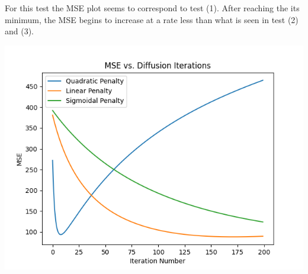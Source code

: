 \documentclass{article}
\begin{document}
  \noindent For this test the MSE plot seems to correspond to
  test (1). After reaching the its minimum, the MSE begins to
  increase at a rate less than what is seen in test (2) and (3).
  \begin{center}
    \includegraphics[scale=0.5]{../generated_images/MSE_test4.png}\\
  \end{center}
\end{document}
